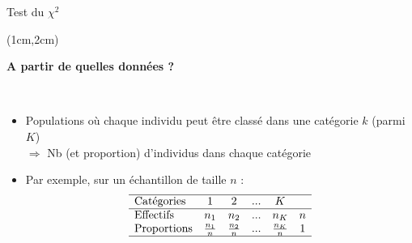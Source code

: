 \documentclass{beamer}
\begin{document}
\begin{frame}{Test du $\chi^2$}
\begin{textblock*}{\textwidth}(1cm,2cm)

\begin{center}{\bf \Large A partir de quelles données ?} \end{center}

\

\begin{itemize}
\item Populations où chaque individu peut être classé dans une catégorie $k$ (parmi 
$K$) \\
$\Rightarrow$ Nb (et proportion) d'individus dans chaque catégorie \\

\vspace{0.5cm}
\item Par exemple, sur un échantillon de taille $n$ : 
$$
\begin{array}{lcccccc}
\hline
\mbox{Catégories} & 1 & 2 & ... & K & \\
\hline
\mbox{Effectifs}  & n_1 & n_2 & ... & n_K & n \\
\mbox{Proportions}  & \frac{n_1}n & \frac{n_2}n & ...& \frac{n_K}n & 1 \\
\hline
\end{array}
$$

\end{itemize}

\end{textblock*}

\end{frame}

\end{document}
